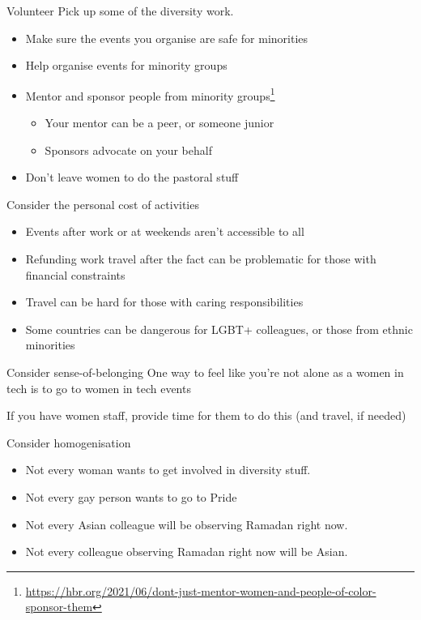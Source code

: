 \documentclass[xcolor=table,aspectratio=169]{beamer}
\begin{document}
\begin{frame}{Volunteer}
        Pick up some of the diversity work. 
	\begin{itemize}
		\item Make sure the events you organise are safe for minorities
		\item Help organise events for minority groups
		\item Mentor and sponsor people from minority groups\footnote{\url{https://hbr.org/2021/06/dont-just-mentor-women-and-people-of-color-sponsor-them}} 
			\begin{itemize}
				\item Your mentor can be a peer, or someone junior
				\item Sponsors advocate on your behalf
			\end{itemize}
		\item Don't leave women to do the pastoral stuff 
	\end{itemize}
\end{frame}
\begin{frame}{Consider the personal cost of activities}
	\begin{itemize}
		\item Events after work or at weekends aren't accessible to all
		\item Refunding work travel after the fact can be problematic for those with financial constraints
	\item Travel can be hard for those with caring responsibilities
	\item Some countries can be dangerous for LGBT+ colleagues, or those from ethnic minorities
	\end{itemize}
\end{frame}
\begin{frame}{Consider sense-of-belonging}
One way to feel like you're not alone as a women in tech is to go to women in tech events 

	\vspace{0.5em}

	If you have women staff, provide time for them to do this (and travel, if needed)
\end{frame}

\begin{frame}{Consider homogenisation}
	\begin{itemize}
		\item Not every woman wants to get involved in diversity stuff.
		\item Not every gay person wants to go to Pride
		\item Not every Asian colleague will be observing Ramadan right now. 
		\item Not every colleague observing Ramadan right now will be Asian.  
	\end{itemize}
\end{frame}
\end{document}
